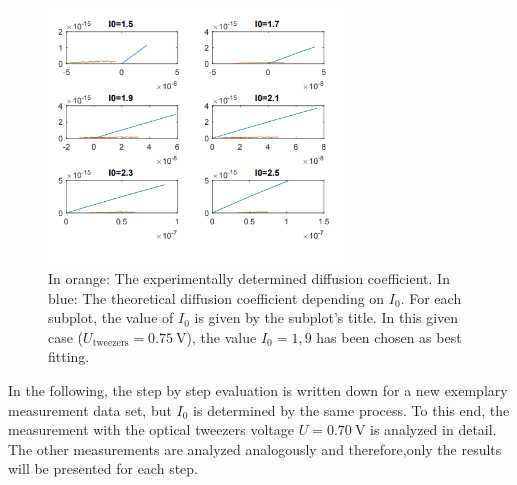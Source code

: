 \documentclass[../bericht.tex]{subfiles}
\begin{document}
       \begin{figure}[htb]
             \centering
             \includegraphics[width=0.70\textwidth]{figures/I0determination.PNG}
             \caption{In orange: The experimentally determined diffusion coefficient. In blue: The theoretical diffusion coefficient depending on $I_0$. For each subplot, the value of $I_0$ is given by the subplot's title. In this given case ($U_\mathrm{tweezers}=\SI{0,75}{\volt}$), the value $I_0=1,9$ has been chosen as best fitting. }
             \label{fig:I0determination}
       \end{figure}

      In the following, the step by step evaluation is written down for a new exemplary measurement data set, but $I_0$ is determined by the same process. To this end, the measurement with the optical tweezers voltage $U=\SI{0,70}{\volt}$ is analyzed in detail.  The other measurements are analyzed analogously and therefore,only the results will be presented for each step.
      \medskip
\end{document}
